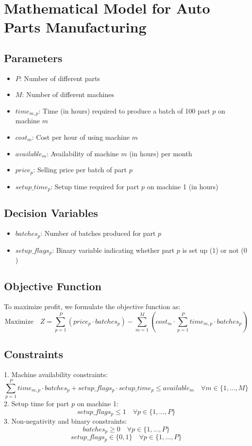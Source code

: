 \documentclass{article}
\begin{document}
\section*{Mathematical Model for Auto Parts Manufacturing}

\subsection*{Parameters}
\begin{itemize}
    \item $P$: Number of different parts
    \item $M$: Number of different machines
    \item $time_{m,p}$: Time (in hours) required to produce a batch of 100 part $p$ on machine $m$
    \item $cost_{m}$: Cost per hour of using machine $m$
    \item $available_{m}$: Availability of machine $m$ (in hours) per month
    \item $price_{p}$: Selling price per batch of part $p$
    \item $setup\_time_{p}$: Setup time required for part $p$ on machine 1 (in hours)
\end{itemize}

\subsection*{Decision Variables}
\begin{itemize}
    \item $batches_{p}$: Number of batches produced for part $p$
    \item $setup\_flags_{p}$: Binary variable indicating whether part $p$ is set up ($1$) or not ($0$)
\end{itemize}

\subsection*{Objective Function}
To maximize profit, we formulate the objective function as:
\[
\text{Maximize} \quad Z = \sum_{p=1}^{P} (price_{p} \cdot batches_{p}) - \sum_{m=1}^{M} (cost_{m} \cdot \sum_{p=1}^{P} time_{m,p} \cdot batches_{p})
\]

\subsection*{Constraints}
1. Machine availability constraints:
\[
\sum_{p=1}^{P} time_{m,p} \cdot batches_{p} + setup\_flags_{p} \cdot setup\_time_{p} \leq available_{m} \quad \forall m \in \{1, \ldots, M\}
\]
2. Setup time for part $p$ on machine 1:
\[
setup\_flags_{p} \leq 1 \quad \forall p \in \{1, \ldots, P\}
\]
3. Non-negativity and binary constraints:
\[
batches_{p} \geq 0 \quad \forall p \in \{1, \ldots, P\}
\]
\[
setup\_flags_{p} \in \{0, 1\} \quad \forall p \in \{1, \ldots, P\}
\]
\end{document}
